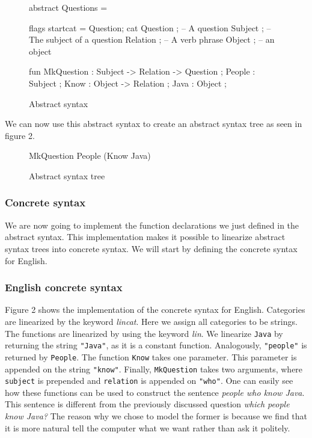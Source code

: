 \begin{figure}[h]
\begin{code}
abstract Questions = { 
  flags startcat = Question; 
  cat
    Question ; -- A question
    Subject ;  -- The subject of a question
    Relation ; -- A verb phrase
    Object ;   -- an object

  fun		 	  
    MkQuestion : Subject -> Relation -> Question ;
    People : Subject ;
    Know : Object -> Relation ;
    Java : Object ; 
}
\end{code}
\caption{Abstract syntax}
\end{figure}

We can now use this abstract syntax to create an abstract syntax tree as seen in figure 2.

\begin{figure}[h]
\begin{plaintext}
MkQuestion People (Know Java)
\end{plaintext}
\caption{Abstract syntax tree}
\end{figure}

\subsubsection*{Concrete syntax}

We are now going to implement the function declarations we just defined in the abstract syntax. This implementation makes it possible to linearize abstract syntax trees into concrete syntax. We will start by defining the concrete syntax for English.

\subsubsection*{English concrete syntax}

Figure 2 shows the implementation of the concrete syntax for English. Categories are linearized by the keyword \emph{lincat}. Here we assign all categories to be strings. The functions are linearized by using the keyword \emph{lin}. We linearize \texttt{Java} by returning the string \texttt{"Java"}, as it is a constant function. Analogously, \texttt{"people"} is returned by \texttt{People}. The function \texttt{Know} takes one parameter. This parameter is appended on the string \texttt{"know"}. Finally, \texttt{MkQuestion} takes two arguments, where \texttt{subject} is prepended and \texttt{relation} is appended on \texttt{"who"}. One can easily see how these functions can be used to construct the sentence \emph{people who know Java}. This sentence is different from the previously discussed question \emph{which people know Java?} The reason why we chose to model the former is because we find that it is more natural tell the computer what we want rather than ask it politely.

